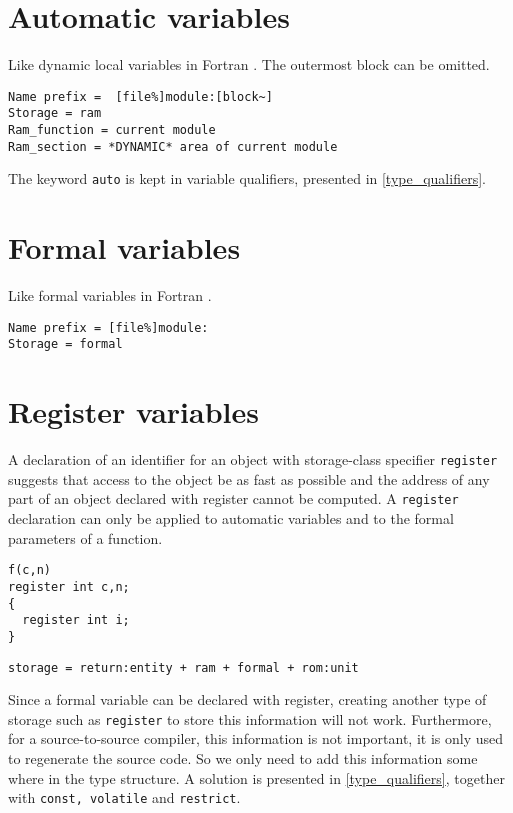 \documentclass[a4paper]{report}
\begin{document}
\section{Automatic variables}

Like dynamic local variables in Fortran \cite{Coel01}. 
The outermost block can be omitted. 
\begin{verbatim}
Name prefix =  [file%]module:[block~]
Storage = ram 
Ram_function = current module 
Ram_section = *DYNAMIC* area of current module
\end{verbatim}
The keyword \verb/auto/ is kept in variable qualifiers, presented in
\ref{type_qualifiers}. 

\section{Formal variables}

Like formal variables in Fortran \cite{Coel01}. 
\begin{verbatim}
Name prefix = [file%]module:
Storage = formal 
\end{verbatim}

\section{Register variables}

A declaration of an identifier for an object with storage-class specifier
\verb/register/ suggests that access to the object be as fast as possible and 
the address of any part of an object declared with register cannot be
computed.  A \verb/register/ declaration can only be applied to automatic 
variables and to the formal parameters of a function. 
 
\begin{lstlisting}
f(c,n)
register int c,n;
{
  register int i;
}
\end{lstlisting}

\begin{verbatim}
storage = return:entity + ram + formal + rom:unit
\end{verbatim}

Since a formal variable can be declared with register, creating another type of storage such as \verb/register/ to store this
information will not work. Furthermore, for a source-to-source compiler, this
information is not important, it is only used to regenerate the source
code. So we only need to add this information some where in the type
structure. A solution is presented in \ref{type_qualifiers}, together with
\verb/const, volatile/ and \verb/restrict/.
\end{document}
